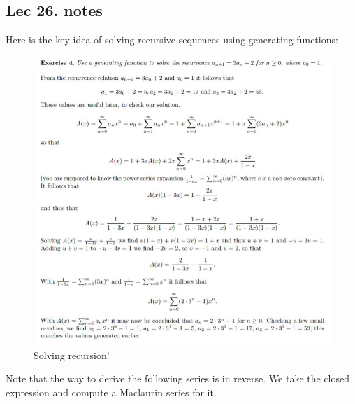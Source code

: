 \documentclass[titlepage]{article}
\theoremstyle{definition}
\numberwithin{equation}{subsection}
\numberwithin{remark}{subsection}
\begin{document}
\subsection{Lec 26. notes}
Here is the key idea of solving recursive sequences using generating functions:

\begin{figure}[H]
    \centering
    \includegraphics{epflLectureNotes/advancedComputation/figures/genfunc.JPG}
    \caption{Solving recursion!}
\end{figure}

Note that the way to derive the following series is in reverse. We take the closed expression and compute a Maclaurin series for it.  
\end{document}
